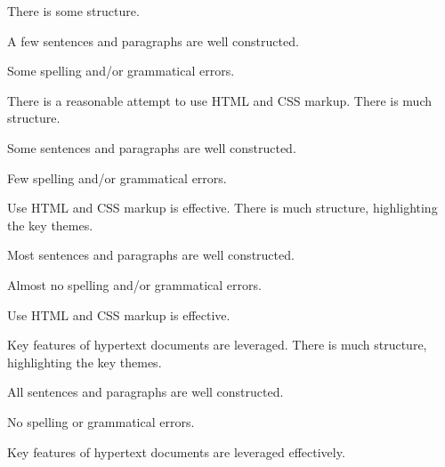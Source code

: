 \documentclass{../../fal_assignment}
\begin{document}
\begin{markingrubric}
        \grade 		There is some structure.
        \par 			A few sentences and paragraphs are well constructed.
         \par 			Some spelling and/or grammatical errors.
         \par			There is a reasonable attempt to use HTML and CSS markup.        
        \grade 		There is much structure.
        \par 			Some sentences and paragraphs are well constructed.
         \par 			Few spelling and/or grammatical errors.
         \par			Use HTML and CSS markup is effective.    
        \grade 		There is much structure, highlighting the key themes.
        \par 			Most sentences and paragraphs are well constructed.
        \par 			Almost no spelling and/or grammatical errors.
         \par			Use HTML and CSS markup is effective.  
         \par			Key features of hypertext documents are leveraged.  
        \grade 		There is much structure, highlighting the key themes.
        \par 			All sentences and paragraphs are well constructed.
        \par 			No spelling or grammatical errors.
         \par			Key features of hypertext documents are leveraged effectively.  
\end{markingrubric}
\end{document}
